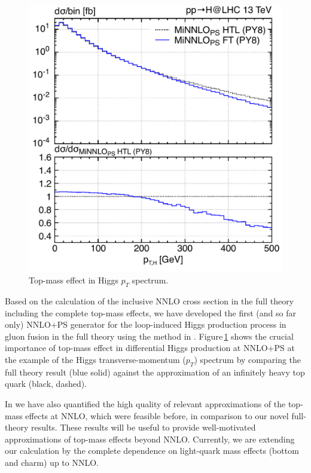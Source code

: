 \documentclass{FBR_Bericht_2025}
\begin{document}
\begin{refsection}
\begin{figure}[h!]
\begin{center}
\includegraphics[width=0.95\linewidth]{plots/ptH_diphotons_mass_effect.pdf}
\caption{Top-mass effect in Higgs $p_T$ spectrum.}
\label{fig:topmass_Higgs_pT}
\end{center}
\end{figure}
%
Based on the calculation of the inclusive NNLO cross section in the full theory
including the complete top-mass effects,
we have developed the first (and so far only) 
NNLO+PS generator for the loop-induced 
Higgs production process in gluon fusion in the full theory using 
the \minnlo{} method in \citere{}. Figure\,\ref{fig:topmass_Higgs_pT} shows
the crucial importance of top-mass effect in differential Higgs production
at NNLO+PS at the example of the Higgs transverse-momentum ($p_T$)
spectrum by comparing the full theory result (blue solid) against
the approximation of an infinitely heavy top quark (black, dashed).

In \citere{} we have also quantified the high quality of relevant approximations 
of the top-mass effects at NNLO, which were feasible before, in comparison to our 
novel full-theory results. These results will be useful to provide well-motivated 
approximations of top-mass effects beyond NNLO. Currently, we are extending 
our \minnlo{} calculation by the complete dependence on light-quark mass 
effects (bottom and charm) up to NNLO.
%

\end{refsection}
\end{document}
